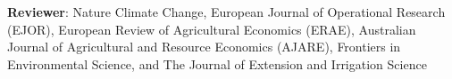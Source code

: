 
\textbf{Reviewer}: Nature Climate Change, European Journal of Operational Research (EJOR), European Review of Agricultural Economics (ERAE), Australian Journal of Agricultural and Resource Economics (AJARE), Frontiers in Environmental Science, and The Journal of Extension and Irrigation Science